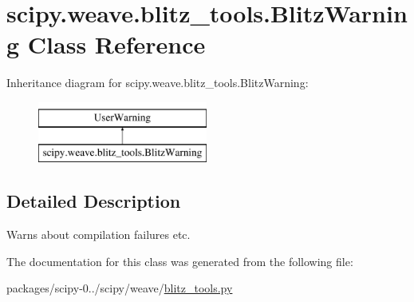 \hypertarget{classscipy_1_1weave_1_1blitz__tools_1_1BlitzWarning}{}\section{scipy.\+weave.\+blitz\+\_\+tools.\+Blitz\+Warning Class Reference}
\label{classscipy_1_1weave_1_1blitz__tools_1_1BlitzWarning}
Inheritance diagram for scipy.\+weave.\+blitz\+\_\+tools.\+Blitz\+Warning\+:\begin{figure}[H]
\begin{center}
\leavevmode
\includegraphics[height=2.000000cm]{classscipy_1_1weave_1_1blitz__tools_1_1BlitzWarning}
\end{center}
\end{figure}


\subsection{Detailed Description}
\begin{DoxyVerb}Warns about compilation failures etc.\end{DoxyVerb}
 

The documentation for this class was generated from the following file\+:\begin{DoxyCompactItemize}
\item 
packages/scipy-\/0../scipy/weave/\hyperlink{blitz__tools_8py}{blitz\+\_\+tools.\+py}\end{DoxyCompactItemize}
